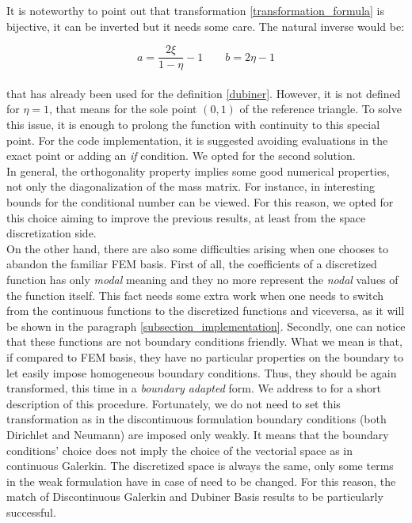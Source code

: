 \documentclass[a4paper,11pt]{article}
\begin{document}
    \noindent It is noteworthy to point out that transformation \ref{transformation_formula} is bijective, it can be inverted but it needs some care. The natural inverse would be:
    
    \begin{equation}
    a = \frac{2\xi}{1-\eta}-1 \quad \quad b = 2\eta-1
    \end{equation}
    \vspace{2mm} \\
    \noindent that has already been used for the definition \ref{dubiner}. However, it is not defined for $\eta=1$, that means for the sole point $(0,1)$ of the reference triangle. To solve this issue, it is enough to prolong the function with continuity to this special point. For the code implementation, it is suggested avoiding evaluations in the exact point or adding an \emph{if} condition. We opted for the second solution. \\
    
    \noindent In general, the orthogonality property implies some good numerical properties, not only the diagonalization of the mass matrix. For instance, in \cite{antonietti} interesting bounds for the conditional number can be viewed. For this reason, we opted for this choice aiming to improve the previous results, at least from the space discretization side. \\
    
    \noindent On the other hand, there are also some difficulties arising when one chooses to abandon the familiar FEM basis. First of all, the coefficients of a discretized function has only \emph{modal} meaning and they no more represent the \emph{nodal} values of the function itself. This fact needs some extra work when one needs to switch from the continuous functions to the discretized functions and viceversa, as it will be shown in the paragraph \ref{subsection_implementation}. Secondly, one can notice that these functions are not boundary conditions friendly. What we mean is that, if compared to FEM basis, they have no particular properties on the boundary to let easily impose homogeneous boundary conditions. Thus, they should be again transformed, this time in a \emph{boundary adapted} form. We address to \cite{napde} for a short description of this procedure. Fortunately, we do not need to set this transformation as in the discontinuous formulation boundary conditions (both Dirichlet and Neumann) are imposed only weakly. It means that the boundary conditions' choice does not imply the choice of the vectorial space as in continuous Galerkin. The discretized space is always the same, only some terms in the weak formulation have in case of need to be changed. For this reason, the match of Discontinuous Galerkin and Dubiner Basis results to be particularly successful. \\
    
\end{document}
